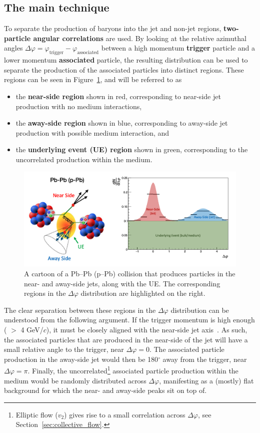 \subsection{The main technique}
To separate the production of \lmb baryons into the jet and non-jet regions, \textbf{two-particle angular correlations} are used. By looking at the relative azimuthal angles $\Delta\varphi = \varphi_{\text{trigger}} - \varphi_{\text{associated}}$ between a high momentum \textbf{trigger} particle and a lower momentum \textbf{associated} particle, the resulting distribution can be used to separate the production of the associated particles into distinct regions. These regions can be seen in Figure~\ref{fig:dphi_cartoon}, and will be referred to as
%
\begin{itemize}
\item the \textbf{near-side region} shown in red, corresponding to near-side jet production with no medium interactions, 
\item the \textbf{away-side region} shown in blue, corresponding to away-side jet production with possible medium interaction, and
\item the \textbf{underlying event (UE) region} shown in green, corresponding to the uncorrelated production within the medium.
\end{itemize}
%
\begin{figure}
\centering
\includegraphics[width=\textwidth]{figures/mnm/dphi_cartoon.png}
\caption{A cartoon of a Pb--Pb (p--Pb) collision that produces particles in the near- and away-side jets, along with the UE. The corresponding regions in the $\Delta\varphi$ distribution are highlighted on the right.}
\label{fig:dphi_cartoon}
\end{figure}

The clear separation between these regions in the $\Delta\varphi$ distribution can be understood from the following argument. If the trigger momentum is high enough ( $>$ 4 GeV/$c$), it must be closely aligned with the near-side jet axis~\cite{JetAxisArgument}. As such, the associated particles that are produced in the near-side of the jet will have a small relative angle to the trigger, near $\Delta\varphi = 0$. The associated particle production in the away-side jet would then be 180$^\circ$ away from the trigger, near $\Delta\varphi = \pi$. Finally, the uncorrelated\footnote{Elliptic flow ($v_2$) gives rise to a small correlation across $\Delta\varphi$, see Section~\ref{sec:collective_flow}.} associated particle production within the medium would be randomly distributed across $\Delta\varphi$, manifesting as a (mostly) flat background for which the near- and away-side peaks sit on top of. 

